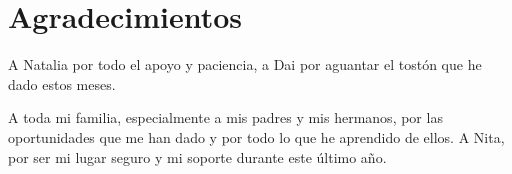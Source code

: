 
\chapter*{Agradecimientos}

A Natalia por todo el apoyo y paciencia, a Dai por aguantar el tostón que he dado estos meses.


A toda mi familia, especialmente a mis padres y mis hermanos, por las oportunidades que me han dado y por todo lo que he aprendido de ellos. A Nita, por ser mi lugar seguro y mi soporte durante este último año.










